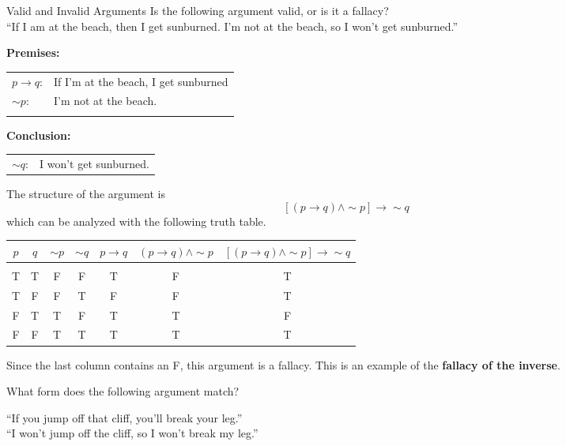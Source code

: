 \begin{example}[https://www.youtube.com/watch?v=QS_cuap6hy0]{Valid and Invalid Arguments}
Is the following argument valid, or is it a fallacy?\\

``If I am at the beach, then I get sunburned.  I'm not at the beach, so I won't get sunburned.''

\sol
\textbf{Premises:}\\
\begin{tabular}{l l}
$p \to q$: & If I'm at the beach, I get sunburned\\
$\sim p$: & I'm not at the beach.\\
& \\
\end{tabular}

\textbf{Conclusion:}\\
\begin{tabular}{l l}
$\sim q$: & I won't get sunburned.
\end{tabular}

The structure of the argument is \[[(p \to q) \wedge \sim p] \to \sim q\]
which can be analyzed with the following truth table.
\begin{center}
\begin{tabular}{|c c c c c c c|}
\hline
$p$ & $q$ & $\sim p$ & $\sim q$ & $p \to q$ & $(p \to q) \wedge \sim p$ & $[(p \to q) \wedge \sim p] \to \sim q$\\
\hline
& & & & & & \\
T & T & F & F & T & F & T\\
T & F & F & T & F & F & T\\
F & T & T & F & T & T & F\\
F & F & T & T & T & T & T\\
\hline
\end{tabular}
\end{center}

Since the last column contains an F, this argument is a fallacy.  This is an example of the \textbf{fallacy of the inverse}.
\end{example}

\begin{try}
What form does the following argument match?

``If you jump off that cliff, you'll break your leg.''\\  ``I won't jump off the cliff, so I won't break my leg.''
\end{try}

